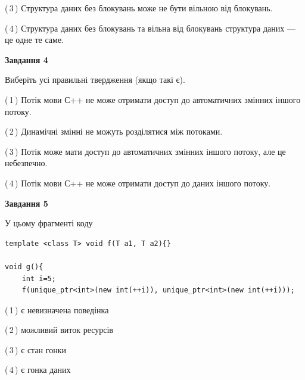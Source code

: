 \documentclass[12pt, ukrainian]{article}
\begin{document}
\begin {large}
{(\,3\,) Структура даних без блокувань може не бути вільною від блокувань.%

(\,4\,) Структура даних без блокувань та вільна від блокувань структура даних --- це одне те саме.%



\begin{center}
\textbf{Завдання 4}
\end{center}
Виберіть усі правильні твердження (якщо такі є).\par
\vspace{2mm}

(\,1\,) Потік мови С++ не може отримати доступ до автоматичних змінних іншого потоку.%

(\,2\,) Динамічні змінні не можуть розділятися між потоками.%

(\,3\,) Потік може мати доступ до автоматичних змінних іншого потоку, але це небезпечно.%

(\,4\,) Потік мови С++ не може отримати доступ до даних іншого потоку.%



\begin{center}
\textbf{Завдання 5}
\end{center}
У цьому фрагменті коду
\begin{verbatim}
template <class T> void f(T a1, T a2){}

void g(){
    int i=5;
    f(unique_ptr<int>(new int(++i)), unique_ptr<int>(new int(++i)));
\end{verbatim}

(\,1\,) є невизначена поведінка%

(\,2\,) можливий виток ресурсів%

(\,3\,) є стан гонки%

(\,4\,) є гонка даних%


}
\end {large}
\end{document}
